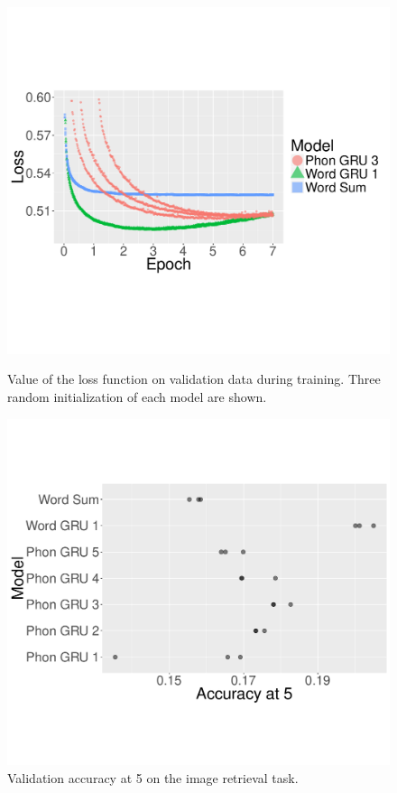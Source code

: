 \begin{figure}
    \centering
  \begin{minipage}{0.45\textwidth}
    \includegraphics[scale=0.32]{loss-zoom.pdf}
    \caption{Value of the loss function on validation data during
      training. Three random initialization of each model are shown.}
    \label{fig:loss}
  \end{minipage}
\hspace{0.3cm}
  \begin{minipage}{0.45\textwidth}
    \includegraphics[scale=0.32]{accat5.pdf}
    \caption{Validation accuracy at 5 on the image retrieval task.}
    \label{fig:accat5}
  \end{minipage}
\end{figure}

